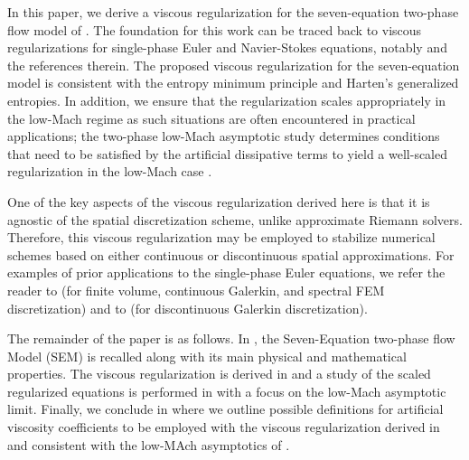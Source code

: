 \documentclass[preprint,10pt]{elsarticle}
\begin{document}
In this paper, we derive a viscous regularization for the seven-equation two-phase flow model of \cite{SEM}. The foundation for this work can be traced back to viscous regularizations for single-phase Euler and Navier-Stokes equations, notably \cite{jlg} and the references therein. The proposed viscous regularization for the seven-equation model is consistent with the entropy minimum principle and Harten's generalized entropies. In addition, we ensure that the regularization scales appropriately in the low-Mach regime as such situations are often encountered in practical applications; the two-phase low-Mach asymptotic study determines conditions that need to be satisfied by the artificial dissipative terms to yield a well-scaled regularization in the low-Mach case \cite{Marco_paper_low_mach}. 

One of the key aspects of the viscous regularization derived here is that it is agnostic of the spatial discretization scheme, unlike approximate Riemann solvers. Therefore, this viscous regularization may be employed to stabilize numerical schemes based on either continuous or discontinuous spatial approximations. For examples of prior applications to the single-phase Euler equations, we refer the reader to \cite{jlg} (for finite volume, continuous Galerkin, and spectral FEM discretization) and to \cite{valentin} (for discontinuous Galerkin discretization). 

The remainder of the paper is as follows. In , the Seven-Equation two-phase flow Model (SEM) is recalled along with its main physical and mathematical properties. The viscous regularization is derived in  and a study of the scaled regularized equations is performed in  with a focus on the low-Mach asymptotic limit. 
Finally, we conclude in  where we outline possible definitions for artificial viscosity coefficients to be employed with the viscous regularization derived in  and consistent with the low-MAch asymptotics of .
\end{document}
